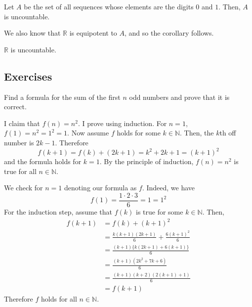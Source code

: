   \begin{theorem}
    Let $A$ be the set of all sequences whose elements are the digits $0$ and $1$. Then, $A$ is uncountable. 
  \end{theorem}

  We also know that $\mathbb{R}$ is equipotent to $A$, and so the corollary follows. 

  \begin{corollary}
    $\mathbb{R}$ is uncountable. 
  \end{corollary}

\subsection{Exercises} 

  \begin{exercise}
    Find a formula for the sum of the first $n$ odd numbers and prove that it is correct.
  \end{exercise}
  \begin{solution}
    I claim that $f(n) = n^2$. I prove using induction. For $n = 1$, $f(1) = n^2 = 1^2 = 1$. Now assume $f$ holds for some $k \in \mathbb{N}$. Then, the $k$th off number is $2k-1$. Therefore 
    \begin{equation}
      f(k+1) = f(k) + (2k + 1) = k^2 + 2k + 1 = (k + 1)^2
    \end{equation}
    and the formula holds for $k=1$. By the principle of induction, $f(n) = n^2$ is true for all $n \in \mathbb{N}$. 
  \end{solution}

  \begin{exercise}
    We check for $n = 1$ denoting our formula as $f$. Indeed, we have 
    \begin{equation}
      f(1) = \frac{1 \cdot 2 \cdot 3}{6} = 1 = 1^2
    \end{equation} 
    For the induction step, assume that $f(k)$ is true for some $k \in \mathbb{N}$. Then, 
    \begin{align}
      f(k+1) & = f(k) + (k+1)^2 \\
             & = \frac{k (k + 1) (2k + 1)}{6} + \frac{6 (k+1)^2}{6} \\
             & = \frac{(k+1) \{ k (2k+1) + 6(k+1)\}}{6} \\
             & = \frac{(k+1) (2k^2 + 7k + 6)}{6} \\
             & = \frac{(k+1)(k+2)(2(k+1) + 1)}{6} \\
             & = f(k+1)
    \end{align}
    Therefore $f$ holds for all $n \in \mathbb{N}$. 
  \end{exercise} 

